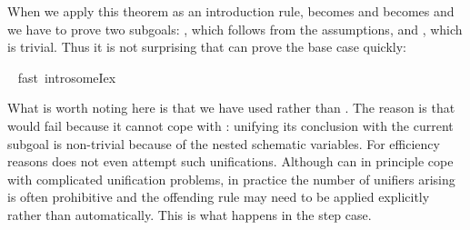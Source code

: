 \begin{isabellebody}
\begin{isamarkuptxt}
\begin{isabelle}
\end{isabelle}
When we apply this theorem as an introduction rule,  becomes
 and  becomes  and we have to prove
two subgoals: , which follows from the assumptions, and
, which is trivial. Thus it is not surprising that
 can prove the base case quickly:%
\end{isamarkuptxt}%
\ \isamarkuptrue%
fast\ intro{\isacharcolon}someI{}{\isacharunderscore}ex{\isacharparenright}\isamarkupfalse%
%
\begin{isamarkuptxt}%
\noindent
What is worth noting here is that we have used  rather than
.  The reason is that  would fail because it cannot
cope with : unifying its conclusion with the current
subgoal is non-trivial because of the nested schematic variables. For
efficiency reasons  does not even attempt such unifications.
Although  can in principle cope with complicated unification
problems, in practice the number of unifiers arising is often prohibitive and
the offending rule may need to be applied explicitly rather than
automatically. This is what happens in the step case.


\end{isamarkuptxt}
\end{isabellebody}
